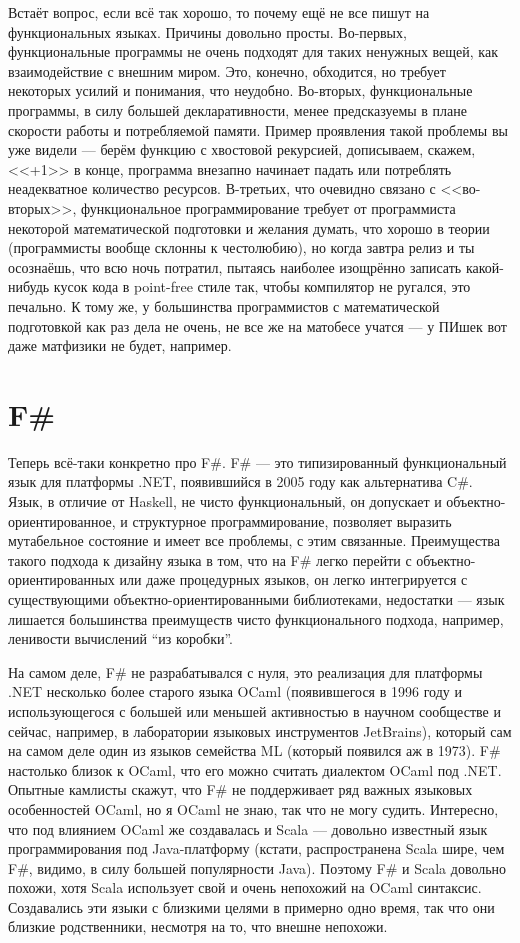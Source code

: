 \documentclass[a5paper]{article}
\begin{document}
Встаёт вопрос, если всё так хорошо, то почему ещё не все пишут на функциональных языках. Причины довольно просты. Во-первых, функциональные программы не очень подходят для таких ненужных вещей, как взаимодействие с внешним миром. Это, конечно, обходится, но требует некоторых усилий и понимания, что неудобно. Во-вторых, функциональные программы, в силу большей декларативности, менее предсказуемы в плане скорости работы и потребляемой памяти. Пример проявления такой проблемы вы уже видели --- берём функцию с хвостовой рекурсией, дописываем, скажем, <<+1>> в конце, программа внезапно начинает падать или потреблять неадекватное количество ресурсов. В-третьих, что очевидно связано с <<во-вторых>>, функциональное программирование требует от программиста некоторой математической подготовки и желания думать, что хорошо в теории (программисты вообще склонны к честолюбию), но когда завтра релиз и ты осознаёшь, что всю ночь потратил, пытаясь наиболее изощрённо записать какой-нибудь кусок кода в point-free стиле так, чтобы компилятор не ругался, это печально. К тому же, у большинства программистов с математической подготовкой как раз дела не очень, не все же на матобесе учатся --- у ПИшек вот даже матфизики не будет, например.

\section{F\#}

Теперь всё-таки конкретно про F\#. F\# --- это типизированный функциональный язык для платформы .NET, появившийся в 2005 году как альтернатива C\#. Язык, в отличие от Haskell, не чисто функциональный, он допускает и объектно-ориентированное, и структурное программирование, позволяет выразить мутабельное состояние и имеет все проблемы, с этим связанные. Преимущества такого подхода к дизайну языка в том, что на F\# легко перейти с объектно-ориентированных или даже процедурных языков, он легко интегрируется с существующими объектно-ориентированными библиотеками, недостатки --- язык лишается большинства преимуществ чисто функционального подхода, например, ленивости вычислений ``из коробки''.

На самом деле, F\# не разрабатывался с нуля, это реализация для платформы .NET несколько более старого языка OCaml (появившегося в 1996 году и использующегося с большей или меньшей активностью в научном сообществе и сейчас, например, в лаборатории языковых инструментов JetBrains), который сам на самом деле один из языков семейства ML (который появился аж в 1973). F\# настолько близок к OCaml, что его можно считать диалектом OCaml под .NET. Опытные камлисты скажут, что F\# не поддерживает ряд важных языковых особенностей OCaml, но я OCaml не знаю, так что не могу судить. Интересно, что под влиянием OCaml же создавалась и Scala --- довольно известный язык программирования под Java-платформу (кстати, распространена Scala шире, чем F\#, видимо, в силу большей популярности Java). Поэтому F\# и Scala довольно похожи, хотя Scala использует свой и очень непохожий на OCaml синтаксис. Создавались эти языки с близкими целями в примерно одно время, так что они близкие родственники, несмотря на то, что внешне непохожи.
\end{document}
